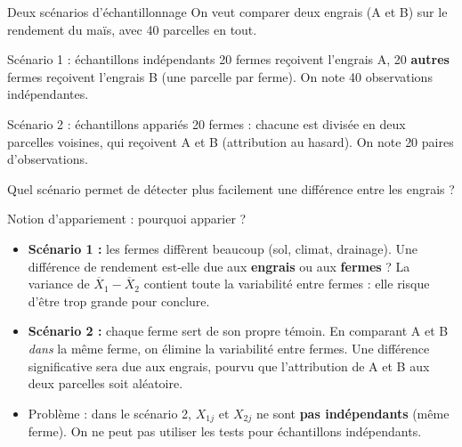 \documentclass{BeamerTemplate}
\begin{document}
\begin{frame}[t]{Deux scénarios d'échantillonnage}
  On veut comparer deux engrais (A et B) sur le rendement du maïs, avec 40 parcelles en tout.

  \bigskip
  \begin{Boite}{Scénario 1 : échantillons indépendants}
    20 fermes reçoivent l'engrais A, 20 \textbf{autres} fermes reçoivent l'engrais B (une parcelle par ferme).
    On note \alert{40 observations indépendantes}.
  \end{Boite}

  \pause
  \begin{Boite}{Scénario 2 : échantillons appariés}
    20 fermes : chacune est divisée en deux parcelles voisines, qui reçoivent A et B (attribution \alert{au hasard}).
    On note \alert{20 paires} d'observations.
  \end{Boite}

  \medskip
  Quel scénario permet de détecter plus facilement une différence entre les engrais ?
\end{frame}

\begin{frame}[t]{Notion d'appariement : pourquoi apparier ?}
  \begin{itemize}\itemsep 3mm
    \item \textbf{Scénario 1 :} les fermes diffèrent beaucoup (sol, climat, drainage).
      Une différence de rendement est-elle due aux \textbf{engrais} ou aux \textbf{fermes} ?
      La variance de $\overline{X}_1 - \overline{X}_2$ contient toute la \alert{variabilité entre fermes} : elle risque d'être trop grande pour conclure.
    \item \textbf{Scénario 2 :} chaque ferme sert de \alert{son propre témoin}. En comparant A et B \emph{dans} la même ferme, on élimine la variabilité entre fermes.
      Une différence significative sera due aux engrais, pourvu que l'attribution de A et B aux deux parcelles soit \alert{aléatoire}.
    \item \alert{Problème :} dans le scénario 2, $X_{1j}$ et $X_{2j}$ ne sont \textbf{pas indépendants} (même ferme).
      On ne peut pas utiliser les tests pour échantillons indépendants.
  \end{itemize}
\end{frame}
\end{document}
